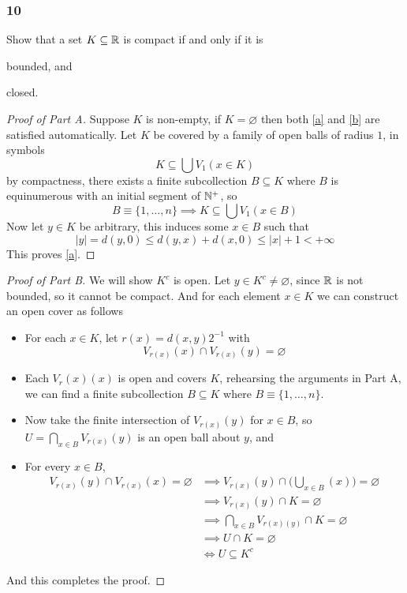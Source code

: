 \documentclass[../main.tex]{subfiles}
\begin{document}
\providecommand{\cant}{\mathcal{C}}
\providecommand{\diam}{\operatorname{diam}}
\subsubsection*{10}
\begin{wts}
    Show that a set $K\subseteq\mathbb{R}$ is compact if and only if it is 
    \begin{enumalpha}
        \item bounded, and\label{a}
        \item closed.\label{b}
    \end{enumalpha}
\end{wts}
\begin{proof}[Proof of Part A]
    Suppose $K$ is non-empty, if $K=\varnothing$ then both \ref{a} and \ref{b} are satisfied automatically. Let $K$ be covered by a family of open balls of radius $1$, in symbols
    \[K\subseteq\bigcup V_1(x\in K)\]
    by compactness, there exists a finite subcollection $B\subseteq K$ where $B$ is equinumerous with an initial segment of $\mathbb{N}^+$, so \[B\equiv\{1,\ldots,n\}\implies K\subseteq\bigcup V_1(x\in B)\]
    Now let $y\in K$ be arbitrary, this induces some $x\in B$ such that
    \[|y|=d(y,0)\leq d(y,x)+d(x,0)\leq |x|+1<+\infty\]
    This proves \ref{a}.
\end{proof}
    
\begin{proof}[Proof of Part B]
    We will show $K^c$ is open. Let $y\in K^c\neq\varnothing$, since $\mathbb{R}$ is not bounded, so it cannot be compact. And for each element $x\in K$ we can construct an open cover as follows
    \begin{itemize}
        \item For each $x\in K$, let $r(x) = d(x,y)2^{-1}$ with
        \[V_{r(x)}(x)\cap V_{r(x)}(y)=\varnothing\]
        \item Each $V_r(x)(x)$ is open and covers $K$, rehearsing the arguments in Part A, we can find a finite subcollection $B\subseteq K$ where $B\equiv\{1,\ldots,n\}$.
        \item Now take the finite intersection of $V_{r(x)}(y)$ for $x\in B$, so $U=\bigcap_{x\in B}V_{r(x)}(y)$ is an open ball about $y$, and
        \item For every $x\in B$,
        \begin{align*}
            V_{r(x)}(y)\cap V_{r(x)}(x)=\varnothing&\implies V_{r(x)}(y)\cap\biggl(\bigcup_{x\in B}(x)\biggr)=\varnothing\\
            &\implies V_{r(x)}(y)\cap K=\varnothing\\
            &\implies \bigcap_{x\in B} V_{r(x)(y)}\cap K = \varnothing\\
            &\implies U\cap K = \varnothing\\
            &\iff U\subseteq K^c
        \end{align*}
    \end{itemize}
    And this completes the proof.
\end{proof}    
    
\end{document}
